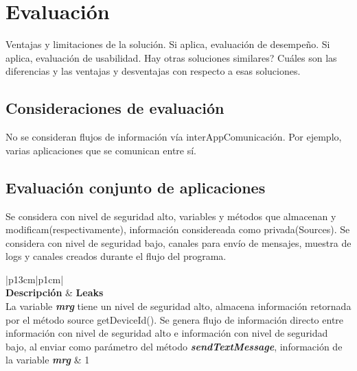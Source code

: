 \label{ch:evaluacion}
\chapter{Evaluación}
Ventajas y limitaciones de la solución.\newline 
Si aplica, evaluación de desempeño.  \newline 
Si aplica, evaluación de usabilidad.  
Hay otras soluciones similares? \newline 
Cuáles son las diferencias y las ventajas y desventajas con respecto a esas soluciones.

\section{Consideraciones de evaluación}
No se consideran flujos de información vía interAppComunicación. Por ejemplo,
varias aplicaciones que se comunican entre sí.

\section{Evaluación conjunto de aplicaciones}

Se considera con nivel de seguridad alto, variables y métodos que almacenan y
modificam(respectivamente), información considereada como
privada(Sources).\newline 
Se considera con nivel de seguridad bajo, canales para envío de mensajes,
muestra de logs y canales creados durante el flujo del programa.

\begin{table}[H]
\small\addtolength{\tabcolsep}{-3pt}
\caption{Descripción aplicaciones de Prueba}
\label{tb:descripApps}
\begin{tabular}{|p{13cm}|p{1cm}|}
	\hline
	\\
	\hline
	\textbf{Descripción} & \textbf{Leaks}\\
	\hline
	La variable \textit{\textbf{mrg}} tiene un nivel de seguridad alto,
	almacena información retornada por el método source getDeviceId(). Se genera
	flujo de información directo entre información con nivel de seguridad alto e
	información con nivel de seguridad bajo, al enviar como parámetro del método
	\textit{\textbf{sendTextMessage}}, información de la variable
	\textit{\textbf{mrg}} & 1
	\\
	\hline
	\hline
\end{tabular}
\end{table}

